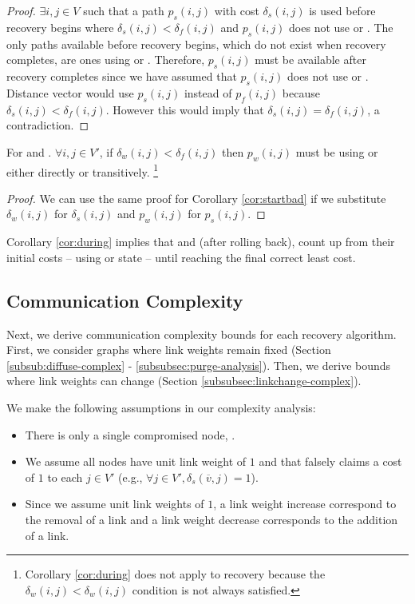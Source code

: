 {\begin{proof}
$\exists i,j\in V$ such that a path $p_{s}(i,j)$ with cost $\delta_{s}(i,j)$ is used before recovery begins where
$\delta_{s}(i,j) < \delta_f(i,j)$ and  $p_{s}(i,j)$ does not use \badvector or \oldvectors.  The only paths available before recovery begins, which do not 
exist when recovery completes, are ones using \badvector or \oldvectors. Therefore, $p_{s}(i,j)$ must be available after recovery completes since we have assumed that
$p_{s}(i,j)$ does not use \badvector or \oldvectors. Distance vector would use  $p_{s}(i,j)$ instead of $p_f(i,j)$ because 
$\delta_{s}(i,j) < \delta_f(i,j)$.  However this would imply that $\delta_{s}(i,j)= \delta_f(i,j)$, a contradiction.
\end{proof}

\begin{corollary}
For \second and \cprs. $\forall i,j \in V'$, if $\delta_w(i,j) < \delta_f(i,j)$ then $p_w(i,j)$  must be using \badvector or \oldvector either directly or transitively.
{\footnote {\small Corollary \ref{cor:during} does not apply to \purge recovery because the  $\delta_w(i,j) < \delta_w(i,j)$ condition is not always satisfied.}} 
\label{cor:during}
\end{corollary}

\begin{proof}
We can use the same proof for Corollary \ref{cor:startbad} if we substitute $\delta_w(i,j)$ for $\delta_s(i,j)$ and $p_w(i,j)$ for $p_s(i,j)$.
\end{proof}

Corollary \ref{cor:during} implies that \second and \cpr (after rolling back), count up from their initial costs -- using \badvector or \oldvector state -- until 
reaching the final correct least cost.



\subsection{Communication Complexity}
\label{subsec:complex}

Next, we derive communication complexity bounds for each recovery algorithm. First, we consider graphs where link weights remain fixed
(Section \ref{subsub:diffuse-complex} - \ref{subsubsec:purge-analysis}). Then, we derive bounds where link weights can change (Section \ref{subsubsec:linkchange-complex}).

We make the following assumptions in our complexity analysis:
\begin{itemize}
	\item There is only a single compromised node, \bads.
	\item We assume all nodes have unit link weight of $1$ and that \bad falsely claims a cost of $1$ to each $j \in V'$ (e.g., $\forall j \in V', \delta_s(\overline{v},j) = 1$).
	\item Since we assume unit link weights of $1$, a link weight increase correspond to the removal of a link and a link weight decrease corresponds to the addition of a link.
\end{itemize}

}
